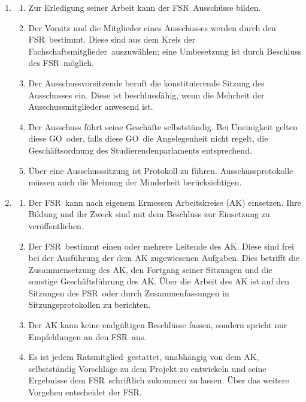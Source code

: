 \documentclass[a4paper, 12pt, ngerman]{article}
\newcommand{\rat}{FSR}
\newcommand{\rates}{FSR}
\newcommand{\go}{GO}
\newcommand{\mitglied}{Ratsmitglied}
\newcommand{\fsmitglieder}{Fachschaftsmitglieder}
\begin{document}
\begin{enumerate}[leftmargin=0cm]
	\item {}\label{ausschuss}
	
	\begin{enumerate}[leftmargin=0cm]
		\item Zur Erledigung seiner Arbeit kann der \rat~Ausschüsse bilden.
		\item Der Vorsitz und die Mitglieder eines Ausschusses werden durch den \rat~bestimmt. Diese sind aus dem Kreis der \fsmitglieder~auszuwählen; eine Umbesetzung ist durch Beschluss des \rates~möglich.
		\item Der Ausschussvorsitzende beruft die konstituierende Sitzung des Ausschusses ein. Diese ist beschlussfähig, wenn die Mehrheit der Ausschussmitglieder anwesend ist.
		\item Der Ausschuss führt seine Geschäfte selbstständig. Bei Uneinigkeit gelten diese \go~oder, falls diese \go~die Angelegenheit nicht regelt, die Geschäftsordnung des Studierendenparlaments entsprechend. 
		\item Über eine Ausschusssitzung ist Protokoll zu führen. Ausschussprotokolle müssen auch die Meinung der Minderheit berücksichtigen.
	\end{enumerate}

	\item {}\label{arbeitskreis}
	
	\begin{enumerate}[leftmargin=0cm]
		\item Der \rat~kann nach eigenem Ermessen Arbeitskreise (AK) einsetzen. Ihre Bildung und ihr Zweck sind mit dem Beschluss zur Einsetzung zu veröffentlichen.
		\item Der \rat~bestimmt einen oder mehrere Leitende des AK. Diese sind frei bei der Ausführung der dem AK zugewiesenen Aufgaben. Dies betrifft die Zusammensetzung des AK, den Fortgang seiner Sitzungen und die sonstige Geschäftsführung des AK. Über die Arbeit des AK ist auf den Sitzungen des \rates~oder durch Zusammenfassungen in Sitzungsprotokollen zu berichten.
		\item Der AK kann keine endgültigen Beschlüsse fassen, sondern spricht nur Empfehlungen an den \rat~aus.
		\item Es ist jedem \mitglied~gestattet, unabhängig von dem AK, selbstständig Vorschläge zu dem Projekt zu entwickeln und seine Ergebnisse dem \rat~schriftlich zukommen zu lassen. Über das weitere Vorgehen entscheidet der \rat.
	\end{enumerate}
	

\end{enumerate}
\end{document}
